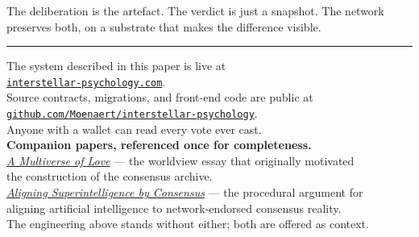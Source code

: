 \documentclass[11pt,a4paper]{article}
\begin{document}
The deliberation is the artefact. The verdict is just a
snapshot. The network preserves both, on a substrate that
makes the difference visible.

\vspace{2em}
\hrule
\vspace{1em}

\begin{center}
\small
The system described in this paper is live at\\
\href{https://interstellar-psychology.com/}{\texttt{interstellar-psychology.com}}.\\
Source contracts, migrations, and front-end code are public at\\
\href{https://github.com/Moenaert/interstellar-psychology}{\texttt{github.com/Moenaert/interstellar-psychology}}.\\
Anyone with a wallet can read every vote ever cast.\\[0.8em]
\textbf{Companion papers, referenced once for completeness.}\\
\href{https://interstellar-psychology.com/artefacts/blockchain/whitepaper.pdf}{\textit{A Multiverse of Love}} ---
the worldview essay that originally motivated\\the construction of the consensus archive.\\[0.4em]
\href{https://interstellar-psychology.com/artefacts/blockchain/superalignment.pdf}{\textit{Aligning Superintelligence by Consensus}} ---
the procedural argument for\\aligning artificial intelligence to network-endorsed consensus reality.\\[0.4em]
The engineering above stands without either; both are offered as context.
\end{center}
\end{document}
